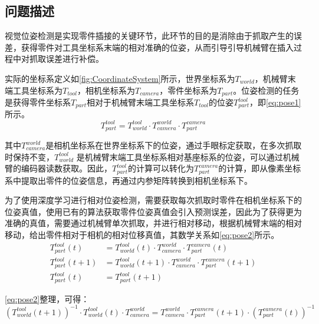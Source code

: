 \documentclass{Diploma}
\begin{document}
\subsection{问题描述}
视觉位姿检测是实现零件插接的关键环节，此环节的目的是消除由于抓取产生的误差，获得零件对工具坐标系末端的相对准确的位姿，从而引导引导机械臂在插入过程中对抓取误差进行补偿。

%

实际的坐标系定义如\ref{fig:CoordinateSystem}所示，世界坐标系为$T_{world}$，机械臂末端工具坐标系为$T_{tool}$，相机坐标系为$T_{camera}$，零件坐标系为$T_{part}$。位姿检测的任务是获得零件坐标系$T_{part}$相对于机械臂末端工具坐标系$T_{tool}$的位姿$T_{part}^{tool}$，即\eqref{eq:pose1}所示。
\begin{equation}
  T_{part}^{tool} =T_{world}^{tool} \cdot T_{camera}^{world} \cdot T_{part}^{camera} \label{eq:pose1}
\end{equation}

其中$T_{camera}^{world}$是相机坐标系在世界坐标系下的位姿，通过手眼标定获取，在多次抓取时保持不变，$T_{world}^{tool}$ 是机械臂末端工具坐标系相对基座标系的位姿，可以通过机械臂的编码器读数获取。因此，$T_{part}^{tool}$的计算可以转化为$T_{part}^{camera}$的计算，即从像素坐标系中提取出零件的位姿信息，再通过内参矩阵转换到相机坐标系下。

%

为了使用深度学习进行相对位姿检测，需要获取每次抓取时零件在相机坐标系下的位姿真值，使用已有的算法获取零件位姿真值会引入预测误差，因此为了获得更为准确的真值，需要通过机械臂单次抓取，并进行相对移动，根据机械臂末端的相对移动，给出零件相对于相机的相对位移真值，其数学关系如\eqref{eq:pose2}所示。
\begin{equation} \label{eq:pose2}
\begin{aligned} 
  T_{part}^{tool}(t) &= T_{world}^{tool}(t) \cdot T_{camera}^{world} \cdot T_{part}^{camera}(t)  \\
  T_{part}^{tool}(t+1) &= T_{world}^{tool}(t+1) \cdot T_{camera}^{world} \cdot T_{part}^{camera}(t+1) \\
  T_{part}^{tool}(t) &= T_{part}^{tool}(t+1) 
\end{aligned}
\end{equation}

\eqref{eq:pose2}整理，可得：
\begin{equation} \label{eq:pose3}
    (T_{world}^{tool}(t+1))^{-1} \cdot T_{world}^{tool}(t) \cdot T_{camera}^{world} = T_{camera}^{world} \cdot T_{part}^{camera}(t+1) \cdot (T_{part}^{camera}(t))^{-1}
\end{equation}
\end{document}
